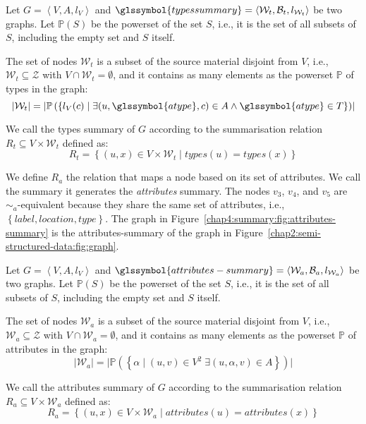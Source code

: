\begin{definition}
	Let $G=\left\langle V, A, l_V \right\rangle$ and $\glssymbol{typessummary} = \left\langle \mathcal{W}_t, \mathcal{B}_t, l_{\mathcal{W}_t} \right\rangle$ be two graphs. Let $\mathbb{P}(S)$ be the powerset of the set $S$, i.e., it is the set of all subsets of $S$, including the empty set and $S$ itself.

	The set of nodes $\mathcal{W}_t$ is a subset of the source material disjoint from $V$, i.e., $\mathcal{W}_t \subseteq \mathcal{Z}$ with $V \cap \mathcal{W}_t = \emptyset$, and it contains as many elements as the powerset $\mathbb{P}$ of types in the graph:
	$$
	\lvert \mathcal{W}_t \rvert = \lvert \mathbb{P}\left( \left\lbrace l_V(c) \mid \exists (u, \glssymbol{atype}, c) \in A \wedge \glssymbol{atype} \in T \right\rbrace \right) \rvert
	$$

	We call  the types summary of $G$ according to the summarisation relation $R_t \subseteq V \times \mathcal{W}_t$ defined as:
	$$
	R_t = \left\lbrace (u, x) \in V \times \mathcal{W}_t \mid types(u) = types(x) \right\rbrace
	$$
	\label{chap4:summary:def:types}
\end{definition}
\vspace{.5cm}


We define $R_a$ the relation that maps a node based on its set of \gls{attributes}. We call the summary it generates the \emph{attributes} summary.
The nodes $v_3$, $v_4$, and $v_5$ are $\sim_a$-equivalent because they share the same set of attributes, i.e., $\left\lbrace label, location, type \right\rbrace$. The graph in Figure~\ref{chap4:summary:fig:attributes-summary} is the \gls{attributes-summary} of the graph in Figure~\ref{chap2:semi-structured-data:fig:graph}.

\begin{definition}
	Let $G=\left\langle V, A, l_V \right\rangle$ and $\glssymbol{attributes-summary} = \left\langle \mathcal{W}_a, \mathcal{B}_a, l_{\mathcal{W}_a} \right\rangle$ be two graphs. Let $\mathbb{P}(S)$ be the powerset of the set $S$, i.e., it is the set of all subsets of $S$, including the empty set and $S$ itself.

	The set of nodes $\mathcal{W}_a$ is a subset of the source material disjoint from $V$, i.e., $\mathcal{W}_a \subseteq \mathcal{Z}$ with $V \cap \mathcal{W}_a = \emptyset$, and it contains as many elements as the powerset $\mathbb{P}$ of attributes in the graph:
	$$
	\lvert \mathcal{W}_a \rvert = \lvert \mathbb{P}\left( \left\lbrace \alpha \mid (u, v) \in V^2\; \exists (u, \alpha, v) \in A \right\rbrace \right) \rvert
	$$

	We call  the attributes summary of $G$ according to the summarisation relation $R_a \subseteq V \times \mathcal{W}_a$ defined as:
	$$
	R_a = \left\lbrace (u, x) \in V \times \mathcal{W}_a \mid attributes(u) = attributes(x) \right\rbrace
	$$
	\label{chap4:summary:def:attributes}
\end{definition}

